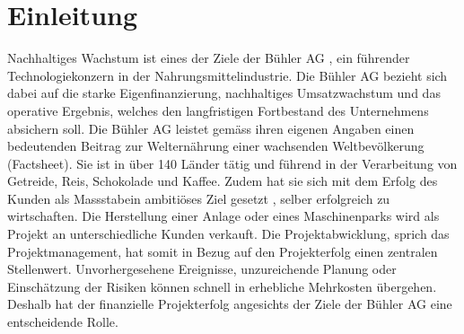 \chapter{Einleitung}
\glqq Nachhaltiges Wachstum\grqq{} ist eines der Ziele der Bühler AG \citep{Buhl}, ein führender Technologiekonzern in der Nahrungsmittelindustrie. Die Bühler AG \citet{Buhl} bezieht sich dabei auf die starke Eigenfinanzierung, nachhaltiges Umsatzwachstum und das operative Ergebnis, welches den langfristigen Fortbestand des Unternehmens absichern soll. Die Bühler AG leistet gemäss ihren eigenen Angaben einen bedeutenden Beitrag zur Welternährung einer wachsenden Weltbevölkerung (Factsheet). Sie ist in über 140 Länder tätig und führend in der Verarbeitung von Getreide, Reis, Schokolade und Kaffee. Zudem hat sie sich mit dem \glqq Erfolg des Kunden als Massstab\grqq{ }ein ambitiöses Ziel gesetzt \citet{Buhl}, selber erfolgreich zu wirtschaften. Die Herstellung einer Anlage oder eines Maschinenparks wird als Projekt an unterschiedliche Kunden verkauft. Die Projektabwicklung, sprich das Projektmanagement, hat somit in Bezug auf den Projekterfolg einen zentralen Stellenwert. Unvorhergesehene Ereignisse, unzureichende Planung oder Einschätzung der Risiken können schnell in erhebliche Mehrkosten übergehen. Deshalb hat der finanzielle Projekterfolg angesichts der Ziele der Bühler AG eine entscheidende Rolle.
\newline\newline
